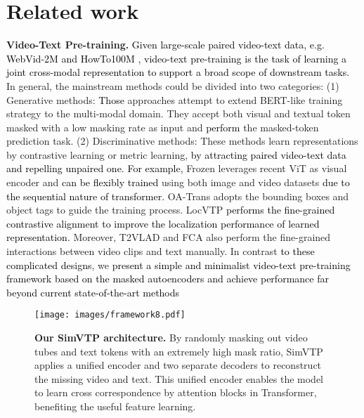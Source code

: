 \documentclass[10pt,twocolumn,letterpaper]{article}
\newcommand{\yty}[1]{\textcolor{black}{#1}}
\begin{document}
\section{Related work}
\label{sec:Related}
\noindent\textbf{Video-Text Pre-training.}
\yty{Given large-scale paired video-text data, e.g. WebVid-2M \cite{bain2021frozen} and HowTo100M \cite{miech2019howto100m}, video-text pre-training is the task of learning a joint cross-modal representation to support a broad scope of downstream tasks. }
In general,
the mainstream methods could be divided into two categories:
(1) Generative methods:
\yty{Those }approaches \cite{li2019visualbert,fu2021violet,tang2019coin,liu2022ts2net, chen2020uniter, wang2021dig} attempt to extend BERT-like\cite{zhu2020actbert} training strategy to the multi-modal domain.
They accept both visual and textual token masked with a low masking rate as input and \yty{perform} the masked-token prediction task. (2) Discriminative methods:
These methods learn representations by contrastive learning or metric learning, \yty{by attracting paired video-text data and repelling unpaired one. }
\yty{For example,} Frozen \cite{bain2021frozen} leverages recent ViT\cite{dosovitskiy2020image} as visual encoder and \yty{can be flexibly trained} using both image and video datasets \yty{due to the sequential nature of transformer.}
OA-Trans \cite{wang2022object} adopts the bounding boxes and object tags to guide the training process. 
LocVTP \cite{cao2022locvtp} \yty{performs the fine-grained contrastive alignment to improve the localization performance of learned representation. }
Moreover, T2VLAD  \cite{wang2021t2vlad} and FCA \cite{han2021fine} also perform the ﬁne-grained interactions between video clips and text manually.
In contrast \yty{ to these complicated designs}, we \yty{present a simple and minimalist video-text pre-training framework based on the masked autoencoders and achieve performance far beyond current state-of-the-art methods}
\begin{figure*}
	\texttt{[image: images/framework8.pdf]}
	\caption{\textbf{Our SimVTP architecture.} By randomly masking out video tubes and text tokens with an extremely high mask ratio, SimVTP applies a unified encoder and two separate decoders to reconstruct the missing video and text. This unified encoder enables the model to learn cross correspondence by attention blocks in Transformer, benefiting the useful feature learning.}
	\label{fig:2}
	\vspace{-0.3cm}
\end{figure*}
\end{document}
